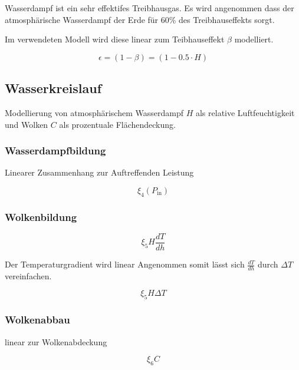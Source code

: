 \begin{refsection}
Wasserdampf ist ein sehr effektifes Treibhausgas. Es wird angenommen dass der atmosphärische Wasserdampf der Erde für 60\% des Treibhauseffekts sorgt.  


Im verwendeten Modell wird diese linear zum Teibhauseffekt $\beta$ modelliert.

\begin{equation}
\epsilon  = (1 - \beta) = (1 - 0.5 \cdot H)
\end{equation}

\subsection{Wasserkreislauf}

Modellierung von atmosphärischem Wasserdampf $H$ als relative Luftfeuchtigkeit und Wolken $C$ als prozentuale Flächendeckung.


\subsubsection{Wasserdampfbildung}

Linearer Zusammenhang zur Auftreffenden Leistung

\begin{equation}
\xi_4 (P_{\text{in}})
\end{equation}

\subsubsection{Wolkenbildung}

\begin{equation}
\xi_5 H \frac{dT}{dh}
\end{equation}

Der Temperaturgradient wird linear Angenommen somit lässt sich $\frac{dT}{dh}$ durch $\Delta T $ vereinfachen. 

\begin{equation}
\xi_5 H \Delta T
\end{equation}

\subsubsection{Wolkenabbau}

linear zur Wolkenabdeckung

\begin{equation}
\xi_6 C
\end{equation}


\end{refsection}
